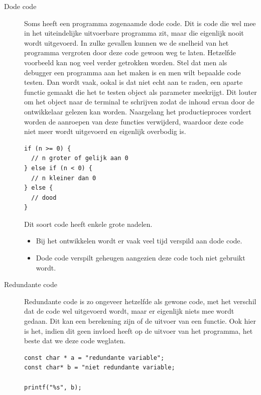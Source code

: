 \documentclass[11pt,a4paper]{article}
\begin{document}
\begin{description}
\item[Dode code] Soms heeft een programma zogenaamde dode code. Dit is code die wel mee in het uiteindelijke uitvoerbare programma zit, maar die eigenlijk nooit wordt uitgevoerd. In zulke gevallen kunnen we de snelheid van het programma vergroten door deze code gewoon weg te laten. Hetzelfde voorbeeld kan nog veel verder getrokken worden. Stel dat men als debugger een programma aan het maken is en men wilt bepaalde code testen. Dan wordt vaak, ookal is dat niet echt aan te raden, een aparte functie gemaakt die het te testen object als parameter meekrijgt. Dit louter om het object naar de terminal te schrijven zodat de inhoud ervan door de ontwikkelaar gelezen kan worden. Naargelang het productieproces vordert worden de aanroepen van deze functies verwijderd, waardoor deze code niet meer wordt uitgevoerd en eigenlijk overbodig is.

\begin{verbatim}
if (n >= 0) {
  // n groter of gelijk aan 0
} else if (n < 0) {
  // n kleiner dan 0
} else {
  // dood
}
\end{verbatim}

Dit soort code heeft enkele grote nadelen.
\begin{itemize}
\item Bij het ontwikkelen wordt er vaak veel tijd verspild aan dode code.
\item Dode code verspilt geheugen aangezien deze code toch niet gebruikt wordt.
\end{itemize}

\item[Redundante code] Redundante code is zo ongeveer hetzelfde als gewone code, met het verschil dat de code wel uitgevoerd wordt, maar er eigenlijk niets mee wordt gedaan. Dit kan een berekening zijn of de uitvoer van een functie. Ook hier is het, indien dit geen invloed heeft op de uitvoer van het programma, het beste dat we deze code weglaten.

\begin{verbatim}
const char * a = "redundante variable";
const char* b = "niet redundante variable;

printf("%s", b);
\end{verbatim}

\end{description}

\end{document}
